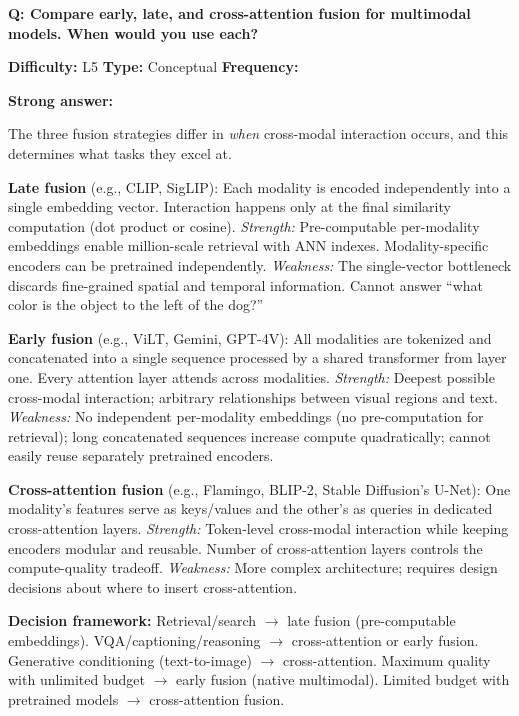 
\begin{interviewq}
\textbf{Q: Compare early, late, and cross-attention fusion for multimodal models. When would you use each?}

\textbf{Difficulty:} L5 \quad \textbf{Type:} Conceptual \quad \textbf{Frequency:} \freqhigh{}

\textbf{Strong answer:}

The three fusion strategies differ in \textit{when} cross-modal interaction occurs, and this determines what tasks they excel at.

\textbf{Late fusion} (e.g., CLIP, SigLIP): Each modality is encoded independently into a single embedding vector. Interaction happens only at the final similarity computation (dot product or cosine). \textit{Strength:} Pre-computable per-modality embeddings enable million-scale retrieval with ANN indexes. Modality-specific encoders can be pretrained independently. \textit{Weakness:} The single-vector bottleneck discards fine-grained spatial and temporal information. Cannot answer ``what color is the object to the left of the dog?''

\textbf{Early fusion} (e.g., ViLT, Gemini, GPT-4V): All modalities are tokenized and concatenated into a single sequence processed by a shared transformer from layer one. Every attention layer attends across modalities. \textit{Strength:} Deepest possible cross-modal interaction; arbitrary relationships between visual regions and text. \textit{Weakness:} No independent per-modality embeddings (no pre-computation for retrieval); long concatenated sequences increase compute quadratically; cannot easily reuse separately pretrained encoders.

\textbf{Cross-attention fusion} (e.g., Flamingo, BLIP-2, Stable Diffusion's U-Net): One modality's features serve as keys/values and the other's as queries in dedicated cross-attention layers. \textit{Strength:} Token-level cross-modal interaction while keeping encoders modular and reusable. Number of cross-attention layers controls the compute-quality tradeoff. \textit{Weakness:} More complex architecture; requires design decisions about where to insert cross-attention.

\textbf{Decision framework:} Retrieval/search $\rightarrow$ late fusion (pre-computable embeddings). VQA/captioning/reasoning $\rightarrow$ cross-attention or early fusion. Generative conditioning (text-to-image) $\rightarrow$ cross-attention. Maximum quality with unlimited budget $\rightarrow$ early fusion (native multimodal). Limited budget with pretrained models $\rightarrow$ cross-attention fusion.


\end{interviewq}
